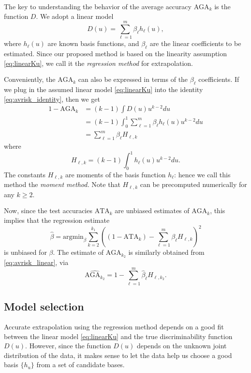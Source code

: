 \documentclass[twoside,11pt]{article}
\newcommand{\argmin}{\text{argmin}}
\begin{document}
The key to understanding the behavior of the average accuracy
$\text{AGA}_k$ is the function ${D}$.  We adopt a linear model
\begin{equation}\label{eq:linearKu}
{D}(u) = \sum_{\ell = 1}^m \beta_\ell h_\ell(u),
\end{equation}
where $h_\ell(u)$ are known basis functions, and $\beta_\ell$ are the
linear coefficients to be estimated.  Since our proposed method is
based on the linearity assumption \eqref{eq:linearKu}, we call it the
\emph{regression method} for extrapolation.

Conveniently, the $\text{AGA}_k$ can also be expressed in terms of the $\beta_\ell$ coefficients.
If we plug in the assumed linear model \eqref{eq:linearKu} into the
identity \eqref{eq:avrisk_identity}, then we get
\begin{align}
1 - \text{AGA}_k &= (k-1)\int {D}(u) u^{k-2} du
\\&= (k-1)\int_0^1 \sum_{\ell = 1}^m \beta_\ell h_\ell(u) u^{k-2} du
\\&= \sum_{\ell = 1}^m \beta_\ell H_{\ell,k} \label{eq:avrisk_linear}
\end{align}
where
\begin{equation}
H_{\ell,k} = (k-1) \int_0^1 h_\ell(u) u^{k-2} du.
\end{equation}
The constants $H_{\ell, k}$ are moments of the basis function
$h_\ell$: hence we call this method the \emph{moment method.}  Note
that $H_{\ell, k}$ can be precomputed numerically for any $k \geq 2$.

Now, since the test accuracies $\text{ATA}_k$ are unbiased estimates
of $\text{AGA}_{k}$, this implies that the regression estimate
\[
\hat{\beta} = \argmin_\beta \sum_{k=2}^{k_1} \left( (1 - \text{ATA}_k) - \sum_{\ell=1}^m \beta_\ell H_{\ell, k}\right)^2
\]
is unbiased for $\beta$. The estimate of $\text{AGA}_{k_2}$ is similarly obtained
from \eqref{eq:avrisk_linear}, via
\begin{equation}\label{eq:avrisk_hat}
\widehat{\text{AGA}_{k_2}} = 1 - \sum_{\ell=1}^m \hat{\beta}_\ell H_{\ell, k_2}.
\end{equation}

\subsection{Model selection}\label{sec:modelselection}

Accurate extrapolation using the regression method depends on a good
fit between the linear model \eqref{eq:linearKu} and the true
discriminability function $D(u)$.  However, since the function $D(u)$
depends on the unknown joint distribution of the data, it makes sense
to let the data help us choose a good basis $\{h_u\}$ from a set of
candidate bases.
\end{document}
